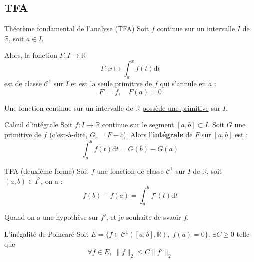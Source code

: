 \subsection{TFA} %
\label{sub:TFA}

\begin{Theorem}{\color{red} Théorème fondamental de l'analyse (TFA)}{}
Soit $f$ continue sur un intervalle $I$ de $\mathbb{R}$, soit $a \in I$. 

Alors, la fonction $F : I \to \mathbb{R}$
\begin{equation}
  F : x \mapsto \int_{a}^{x} f(t) \mathrm{d}t
\end{equation}
est de classe $\mathscr{C} ^{1}$ sur $I$ et est \underline{la seule primitive de $f$ qui s'annule en $a$} : 
\begin{equation}
  F' = f,\quad F(a) = 0
\end{equation}
\end{Theorem}

\begin{Corollary}{}{}
Une fonction continue sur un intervalle de $\mathbb{R}$ \underline{possède une primitive} sur $I$.
\end{Corollary}

\begin{Corollary}{Calcul d'intégrale}{}
  Soit $f : I \to \mathbb{R}$ continue sur le \underline{segment} $[a,b] \subset I$. Soit $G$ une primitive de $f$ (c'est-à-dire, $G_c = F + c$). Alors  l'\textbf{intégrale} de $F$ sur $[a,b]$ est :
  \begin{equation}
    \int_{a}^{b} f(t) \mathrm{d} t = G(b) - G(a)
  \end{equation}
\end{Corollary}

\begin{Theorem}{\color{red} TFA (deuxième forme)}{}
Soit $f$ une fonction de classe $\mathcal{C} ^{1}$ sur $I$ de $\mathbb{R}$, soit $(a,b) \in I ^{2}$, on a :
\begin{equation}
  f(b) - f(a) = \int_{a}^{b} f'(t) \mathrm{d} t
\end{equation}
\end{Theorem}

\begin{note}{}{}
  Quand on a une hypothèse sur $f'$, et je souhaite de svaoir $f$.
\end{note}


\begin{Example}{L'inégalité de Poincaré}{}
  Soit $E = \{ f \in \mathcal{C} ^{1}([a,b], \mathbb{R}), \; f(a) = 0\}$. $\exists C \ge 0$ telle que 
  \begin{equation}
    \forall f \in E, \; \| f \| _{2} \le C \| f' \|_2
  \end{equation}

\end{Example}

